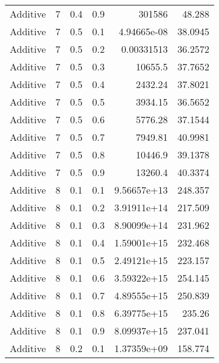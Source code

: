 \documentclass{article}
\begin{document}
\begin{longtable}[H]{lrrrrr}
 Additive       &       7 &   0.4 &            0.9 & 301586           &         48.288  \\
 Additive       &       7 &   0.5 &            0.1 &      4.94665e-08 &         38.0945 \\
 Additive       &       7 &   0.5 &            0.2 &      0.00331513  &         36.2572 \\
 Additive       &       7 &   0.5 &            0.3 &  10655.5         &         37.7652 \\
 Additive       &       7 &   0.5 &            0.4 &   2432.24        &         37.8021 \\
 Additive       &       7 &   0.5 &            0.5 &   3934.15        &         36.5652 \\
 Additive       &       7 &   0.5 &            0.6 &   5776.28        &         37.1544 \\
 Additive       &       7 &   0.5 &            0.7 &   7949.81        &         40.9981 \\
 Additive       &       7 &   0.5 &            0.8 &  10446.9         &         39.1378 \\
 Additive       &       7 &   0.5 &            0.9 &  13260.4         &         40.3374 \\
 Additive       &       8 &   0.1 &            0.1 &      9.56657e+13 &        248.357  \\
 Additive       &       8 &   0.1 &            0.2 &      3.91911e+14 &        217.509  \\
 Additive       &       8 &   0.1 &            0.3 &      8.90099e+14 &        231.962  \\
 Additive       &       8 &   0.1 &            0.4 &      1.59001e+15 &        232.468  \\
 Additive       &       8 &   0.1 &            0.5 &      2.49121e+15 &        223.157  \\
 Additive       &       8 &   0.1 &            0.6 &      3.59322e+15 &        254.145  \\
 Additive       &       8 &   0.1 &            0.7 &      4.89555e+15 &        250.839  \\
 Additive       &       8 &   0.1 &            0.8 &      6.39775e+15 &        235.26   \\
 Additive       &       8 &   0.1 &            0.9 &      8.09937e+15 &        237.041  \\
 Additive       &       8 &   0.2 &            0.1 &      1.37359e+09 &        158.774  \\

\end{longtable}
\end{document}
